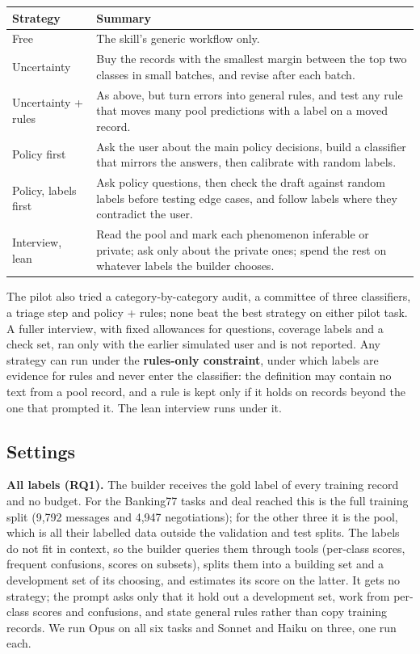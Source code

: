 \documentclass[11pt]{article}
\begin{document}
\begin{center}\small
\begin{tabularx}{\linewidth}{lL}
\toprule
Strategy & Summary \\
\midrule
Free & The skill's generic workflow only. \\
Uncertainty & Buy the records with the smallest margin between the top two classes in small batches, and revise after each batch. \\
Uncertainty + rules & As above, but turn errors into general rules, and test any rule that moves many pool predictions with a label on a moved record. \\
Policy first & Ask the user about the main policy decisions, build a classifier that mirrors the answers, then calibrate with random labels. \\
Policy, labels first & Ask policy questions, then check the draft against random labels before testing edge cases, and follow labels where they contradict the user. \\
Interview, lean & Read the pool and mark each phenomenon inferable or private; ask only about the private ones; spend the rest on whatever labels the builder chooses. \\
\bottomrule
\end{tabularx}
\end{center}

The pilot also tried a category-by-category audit, a committee of three classifiers, a triage step and policy + rules; none beat the best strategy on either pilot task. A fuller interview, with fixed allowances for questions, coverage labels and a check set, ran only with the earlier simulated user and is not reported. Any strategy can run under the \textbf{rules-only constraint}, under which labels are evidence for rules and never enter the classifier: the definition may contain no text from a pool record, and a rule is kept only if it holds on records beyond the one that prompted it. The lean interview runs under it.

\subsection{Settings}

\textbf{All labels (RQ1).} The builder receives the gold label of every training record and no budget. For the Banking77 tasks and deal reached this is the full training split (9,792 messages and 4,947 negotiations); for the other three it is the pool, which is all their labelled data outside the validation and test splits. The labels do not fit in context, so the builder queries them through tools (per-class scores, frequent confusions, scores on subsets), splits them into a building set and a development set of its choosing, and estimates its score on the latter. It gets no strategy; the prompt asks only that it hold out a development set, work from per-class scores and confusions, and state general rules rather than copy training records. We run Opus on all six tasks and Sonnet and Haiku on three, one run each.
\end{document}
